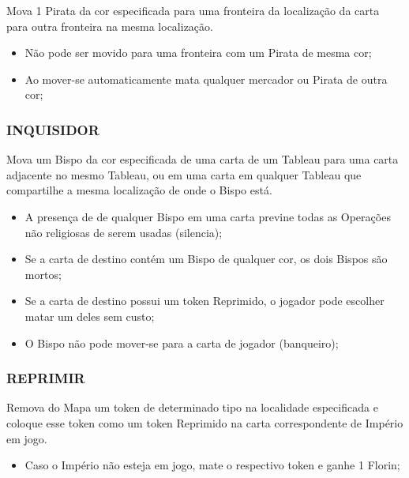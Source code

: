 \documentclass[11pt]{article}
\begin{document}
Mova 1 Pirata da cor especificada para uma fronteira da localização da carta para outra fronteira na mesma localização.

\begin{itemize}
\item Não pode ser movido para uma fronteira com um Pirata de mesma cor;

\item Ao mover-se automaticamente mata qualquer mercador ou Pirata de outra cor;
\end{itemize}

\subsubsection{INQUISIDOR}
\label{sec:orgea319f1}

Mova um Bispo da cor especificada de uma carta de um Tableau para uma carta adjacente no mesmo Tableau, ou em uma carta em qualquer Tableau que compartilhe a mesma localização de onde o Bispo está.

\begin{itemize}
\item A presença de de qualquer Bispo em uma carta previne todas as Operações não religiosas de serem usadas (silencia);

\item Se a carta de destino contém um Bispo de qualquer cor, os dois Bispos são mortos;

\item Se a carta de destino possui um token Reprimido, o jogador pode escolher matar um deles sem custo;

\item O Bispo não pode mover-se para a carta de jogador (banqueiro);
\end{itemize}

\subsubsection{REPRIMIR}
\label{sec:org5f807bd}

Remova do Mapa um token de determinado tipo na localidade especificada e coloque esse token como um token Reprimido na carta correspondente de Império em jogo.

\begin{itemize}
\item Caso o Império não esteja em jogo, mate o respectivo token e ganhe 1 Florin;
\end{itemize}
\end{document}
